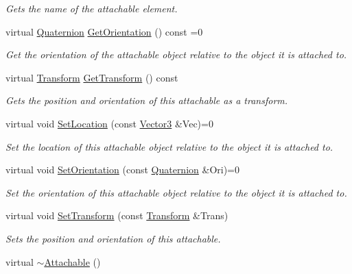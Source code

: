 \begin{DoxyCompactItemize}
\begin{DoxyCompactList}\small\item\em Gets the name of the attachable element. \item\end{DoxyCompactList}\item 
virtual \hyperlink{classMezzanine_1_1Quaternion}{Quaternion} \hyperlink{classMezzanine_1_1Attachable_ab3e094cbc373edb05866783290991e7d}{GetOrientation} () const =0
\begin{DoxyCompactList}\small\item\em Get the orientation of the attachable object relative to the object it is attached to. \item\end{DoxyCompactList}\item 
virtual \hyperlink{classMezzanine_1_1Transform}{Transform} \hyperlink{classMezzanine_1_1Attachable_ad93bd4e039a8807f8e1bdc27668d2177}{GetTransform} () const 
\begin{DoxyCompactList}\small\item\em Gets the position and orientation of this attachable as a transform. \item\end{DoxyCompactList}\item 
virtual void \hyperlink{classMezzanine_1_1Attachable_ae326a2b74e7187504de91106be64b956}{SetLocation} (const \hyperlink{classMezzanine_1_1Vector3}{Vector3} \&Vec)=0
\begin{DoxyCompactList}\small\item\em Set the location of this attachable object relative to the object it is attached to. \item\end{DoxyCompactList}\item 
virtual void \hyperlink{classMezzanine_1_1Attachable_a4e987cfdaf8d261764504dbf2f009c74}{SetOrientation} (const \hyperlink{classMezzanine_1_1Quaternion}{Quaternion} \&Ori)=0
\begin{DoxyCompactList}\small\item\em Set the orientation of this attachable object relative to the object it is attached to. \item\end{DoxyCompactList}\item 
virtual void \hyperlink{classMezzanine_1_1Attachable_ae4e0dca08a02b26b93ae3da7ea8ccfe3}{SetTransform} (const \hyperlink{classMezzanine_1_1Transform}{Transform} \&Trans)
\begin{DoxyCompactList}\small\item\em Sets the position and orientation of this attachable. \item\end{DoxyCompactList}\item 
\hypertarget{classMezzanine_1_1Attachable_a3528fbc8f6551a7a8ac1908a69fba32d}{
virtual \hyperlink{classMezzanine_1_1Attachable_a3528fbc8f6551a7a8ac1908a69fba32d}{$\sim$Attachable} ()}
\label{classMezzanine_1_1Attachable_a3528fbc8f6551a7a8ac1908a69fba32d}


\end{DoxyCompactItemize}
